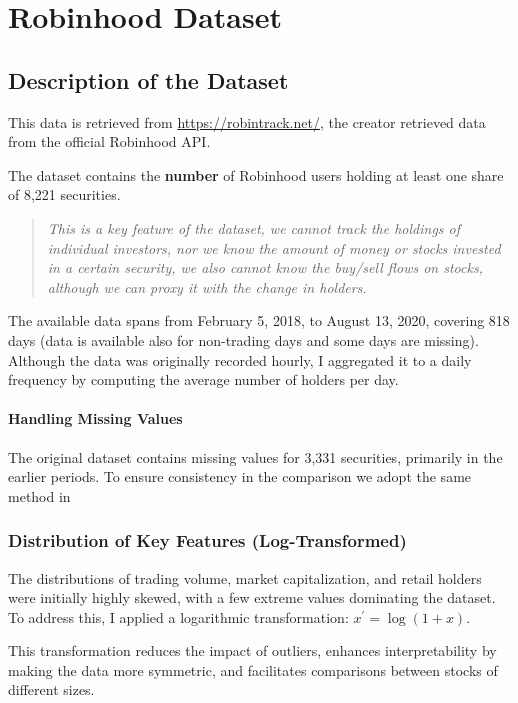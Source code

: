 \section{Robinhood Dataset}
\subsection{Description of the Dataset}
This data is retrieved from \url{https://robintrack.net/}, the creator retrieved data from the official Robinhood API.

The dataset contains the \textbf{number} of Robinhood users holding at least one share of 8,221 securities.

\begin{quote}
    \textit{
        This is a key feature of the dataset, we cannot track the holdings of individual investors, nor we know the amount of money or stocks invested in a certain security, 
        we also cannot know the buy/sell flows on stocks, although we can proxy it with the change in holders.     
        }
\end{quote}

The available data spans from February 5, 2018, to August 13, 2020, covering 818 days (data is available also for non-trading days and some days are missing). 
Although the data was originally recorded hourly, I aggregated it to a daily frequency by computing the average number of holders per day. 



\paragraph{Handling Missing Values}  
The original dataset contains missing values for 3,331 securities, primarily in the earlier periods. 
To ensure consistency in the comparison we adopt the same method in \cite{Fedyk2024}

\subsubsection{Distribution of Key Features (Log-Transformed)}
The distributions of trading volume, market capitalization, and retail holders were initially highly skewed, with a few extreme values dominating the dataset. To address this, I applied a logarithmic transformation: $x^\prime = \log(1+x)$. 

This transformation reduces the impact of outliers, enhances interpretability by making the data more symmetric, and facilitates comparisons between stocks of different sizes.

